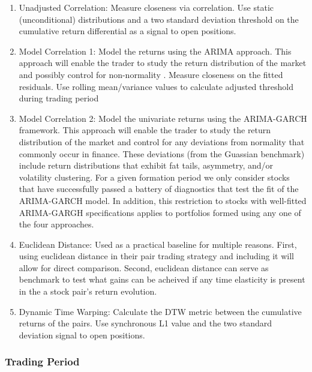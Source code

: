 \documentclass[12pt]{article}
\begin{document}
\begin{enumerate}
    \item Unadjusted Correlation: Measure closeness via correlation. Use static (unconditional) distributions and a two standard deviation threshold on the cumulative return differential as a signal to open positions.
    \item Model Correlation 1: Model the returns using the ARIMA approach. This approach will enable the trader to study the return distribution of the market and possibly control for  non-normality . Measure closeness on the fitted residuals. Use rolling mean/variance values to calculate adjusted threshold during trading period
    \item Model Correlation 2: Model the univariate returns using the ARIMA-GARCH framework. This approach will enable the trader to study the return distribution of the market and control for any deviations from normality that commonly occur in finance. These deviations (from the Guassian benchmark) include return distributions that exhibit fat tails, asymmetry, and/or volatility clustering. For a given formation period we only consider stocks that have successfully passed a battery of diagnostics that test the fit of the ARIMA-GARCH model. In addition, this restriction to stocks with well-fitted ARIMA-GARGH specifications applies to portfolios formed using any one of the four approaches.
    \item Euclidean Distance: Used as a practical baseline for multiple reasons. First, \cite{Gatev_et_al_2006} using euclidean distance in their pair trading strategy and including it will allow for direct comparison. Second, euclidean distance can serve as benchmark to test what gains can be acheived if any time elasticity is present in the a stock pair's return evolution.
    \item Dynamic Time Warping: Calculate the DTW metric between the cumulative returns of the pairs. Use synchronous L1 value and the two standard deviation signal to open positions.
\end{enumerate}

\subsubsection{Trading Period}
\end{document}
